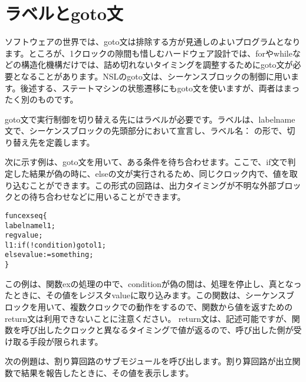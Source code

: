 \chapter{ラベルとgoto文}
\label{chap:label_goto}

ソフトウェアの世界では、goto文は排除する方が見通しのよいプログラムとなります。ところが、1クロックの隙間も惜しむハードウェア設計では、forやwhileなどの構造化機構だけでは、詰め切れないタイミングを調整するためにgoto文が必要となることがあります。NSLのgoto文は、シーケンスブロックの制御に用います。後述する、ステートマシンの状態遷移にもgoto文を使いますが、両者はまったく別のものです。

goto文で実行制御を切り替える先にはラベルが必要です。ラベルは、label\textunderscore{}name文で、シーケンスブロックの先頭部分において宣言し、ラベル名： の形で、切り替え先を定義します。

次に示す例は、goto文を用いて、ある条件を待ち合わせます。ここで、if文で判定した結果が偽の時に、elseの文が実行されるため、同じクロック内で、値を取り込むことができます。この形式の回路は、出力タイミングが不明な外部ブロックとの待ち合わせなどに用いることができます。

\begin{reviewemlist}
\begin{alltt}
func ex seq \{
 label\textunderscore{}name l1;
 reg value;
 l1: if(!condition) goto l1;
     else value:=something;
\}
\end{alltt}
\end{reviewemlist}

この例は、関数exの処理の中で、conditionが偽の間は、処理を停止し、真となったときに、その値をレジスタvalueに取り込みます。この関数は、シーケンスブロックを用いて、複数クロックでの動作をするので、関数から値を返すためのreturn文は利用できないことに注意ください。 return文は、記述可能ですが、関数を呼び出したクロックと異なるタイミングで値が返るので、呼び出した側が受け取る手段が限られます。

次の例題は、割り算回路のサブモジュールを呼び出します。割り算回路が出立関数で結果を報告したときに、その値を表示します。

